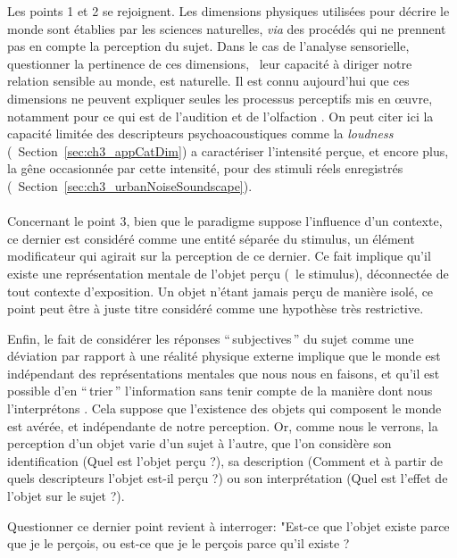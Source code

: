 {Les points 1 et 2 se rejoignent. Les dimensions physiques utilisées pour décrire le monde sont établies par les sciences naturelles, \emph{via} des procédés qui ne prennent pas en compte la perception du sujet. Dans le cas de l'analyse sensorielle, questionner la pertinence de ces dimensions,  \ie~leur capacité à diriger notre relation sensible au monde, est naturelle. Il est connu aujourd'hui que ces dimensions ne peuvent expliquer seules les processus perceptifs mis en œuvre, notamment pour ce qui est de l'audition et de l'olfaction \citep{dubois2000categories}. On peut citer ici la capacité limitée des descripteurs psychoacoustiques comme la \emph{loudness} (\cf~Section~\ref{sec:ch3_appCatDim}) a caractériser l'intensité perçue, et encore plus, la gêne occasionnée par cette intensité, pour des stimuli réels enregistrés (\cf~Section~\ref{sec:ch3_urbanNoiseSoundscape}). \\

 \\

Concernant le point 3, bien que le paradigme suppose l'influence d'un contexte, ce dernier est considéré comme une entité séparée du stimulus, un élément modificateur qui agirait sur la perception de ce dernier. Ce fait implique qu'il existe une représentation mentale de l'objet perçu (\ie~le stimulus), déconnectée de tout contexte d'exposition. Un objet n'étant jamais perçu de manière isolé, ce point peut être à juste titre considéré comme une hypothèse très restrictive.

Enfin, le fait de considérer les réponses ``\,subjectives\,'' du sujet comme une déviation par rapport à une réalité physique externe implique que le monde  est indépendant des représentations mentales que nous nous en faisons, et qu'il est possible d'en ``\,trier\,'' l'information sans tenir compte de la manière dont nous l'interprétons \citep{dubois2000categories}. Cela suppose que l'existence des objets qui composent le monde est avérée, et indépendante de notre perception. Or, comme nous le verrons, la perception d'un objet varie d'un sujet à l'autre, que l'on considère son identification (Quel est l'objet perçu ?), sa description (Comment et à partir de quels descripteurs l'objet est-il perçu ?) ou son interprétation (Quel est l'effet de l'objet sur le sujet ?). 

Questionner ce dernier point revient à interroger: "Est-ce que l'objet existe parce que je le perçois, ou est-ce que je le perçois parce qu'il existe ?

}
